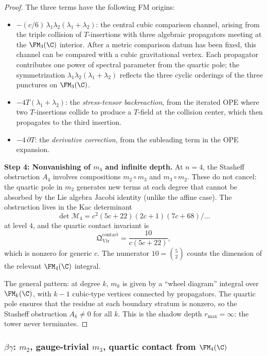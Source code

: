\begin{proof}
The three terms have the following FM origins:
\begin{itemize}
\item $-(c/6)\,\lambda_1\lambda_2(\lambda_1 + \lambda_2)$:
 the central cubic comparison channel, arising from the
 triple collision of $T$-insertions with three algebraic propagators
 meeting at the $\FM_3(\C)$ interior. After a metric comparison datum
 has been fixed, this channel can be compared with a cubic
 gravitational vertex. Each propagator
 contributes one power of spectral parameter from the
 quartic pole; the symmetrization
 $\lambda_1\lambda_2(\lambda_1 + \lambda_2)$ reflects
 the three cyclic orderings of the three punctures on
 $\FM_3(\C)$.
\item $-4T(\lambda_1 + \lambda_2)$: the
 \emph{stress-tensor backreaction}, from the iterated
 OPE where two $T$-insertions collide to produce a
 $T$-field at the collision center, which then propagates
 to the third insertion.
\item $-4\,\partial T$: the \emph{derivative correction},
 from the subleading term in the OPE expansion.
\end{itemize}

\medskip
\textbf{Step 4: Nonvanishing of $m_4$ and infinite depth.}
At $n = 4$, the Stasheff obstruction $A_4$ involves
compositions $m_2 \circ m_3$ and $m_3 \circ m_2$.
These do not cancel: the quartic pole in $m_2$ generates
new terms at each degree that cannot be absorbed by the
Lie algebra Jacobi identity (unlike the affine case).
The obstruction lives in the Kac determinant
\[
\det \mathcal{M}_4
= c^2(5c + 22)(2c + 1)(7c + 68)/\ldots
\]
at level $4$, and the quartic contact invariant is
\[
\mathfrak{Q}^{\mathrm{contact}}_{\mathrm{Vir}}
= \frac{10}{c(5c+22)},
\]
which is nonzero for generic $c$. The numerator
$10 = \binom{5}{2}$ counts the dimension of the relevant
$\FM_4(\C)$ integral.

The general pattern: at degree $k$, $m_k$ is given by
a ``wheel diagram'' integral over $\FM_k(\C)$, with
$k-1$ cubic-type vertices connected by propagators.
The quartic pole ensures that the residue at each
boundary stratum is nonzero, so the Stasheff obstruction
$A_k \ne 0$ for all $k$. This is the shadow depth
$r_{\max} = \infty$: the tower never terminates.
\end{proof}


\subsubsection{$\beta\gamma$: $m_2$, gauge-trivial $m_3$,
quartic contact from $\FM_4(\C)$}

